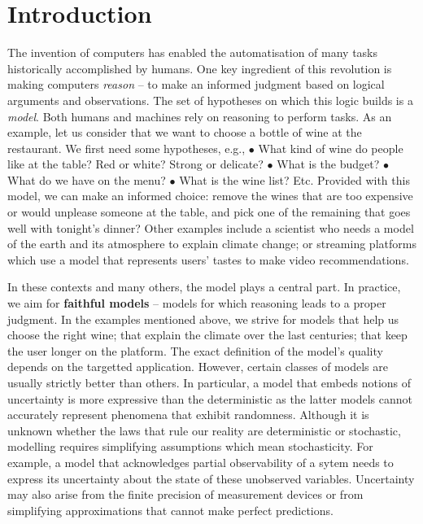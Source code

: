 
\section{Introduction}
The invention of computers has enabled the automatisation of many tasks historically accomplished by humans. One key ingredient of this revolution is making computers \textit{reason} -- to make an informed judgment based on logical arguments and observations. The set of hypotheses on which this logic builds is a \textit{model}. Both humans and machines rely on reasoning to perform tasks. As an example, let us consider that we want to choose a bottle of wine at the restaurant. We first need some hypotheses, e.g., $\bullet$ What kind of wine do people like at the table? Red or white? Strong or delicate? $\bullet$ What is the budget? $\bullet$ What do we have on the menu? $\bullet$ What is the wine list? Etc. Provided with this model, we can make an informed choice: remove the wines that are too expensive or would unplease someone at the table, and pick one of the remaining that goes well with tonight's dinner? Other examples include a scientist who needs a model of the earth and its atmosphere to explain climate change; or streaming platforms which use a model that represents users' tastes to make video recommendations.

In these contexts and many others, the model plays a central part. In practice, we aim for \textbf{faithful models} -- models for which reasoning leads to a proper judgment. In the examples mentioned above, we strive for models that help us choose the right wine; that explain the climate over the last centuries; that keep the user longer on the platform. The exact definition of the model's quality depends on the targetted application. However, certain classes of models are usually strictly better than others.
In particular, a model that embeds notions of uncertainty is more expressive than the deterministic as the latter models cannot accurately represent phenomena that exhibit randomness. Although it is unknown whether the laws that rule our reality are deterministic or stochastic, modelling requires simplifying assumptions which mean stochasticity. For example, a model that acknowledges partial observability of a sytem needs to express its uncertainty about the state of these unobserved variables. Uncertainty may also arise from the finite precision of measurement devices or from simplifying approximations that cannot make perfect predictions.

